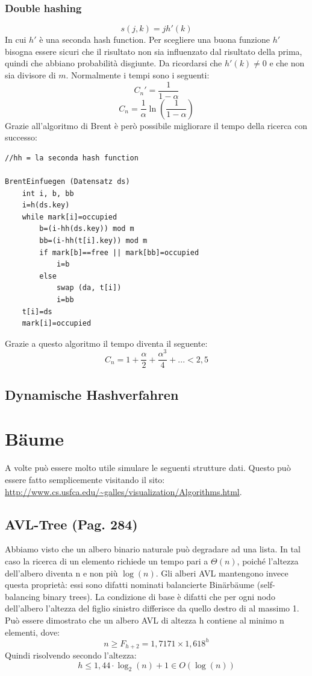 \documentclass[a4paper]{book}
\newcommand{\lstIndent}{4}
\begin{document}
\subsection{Double hashing}
$$s(j,k)=jh'(k) $$
In cui $h'$ è una seconda hash function. Per scegliere una buona funzione $h'$ bisogna essere sicuri che il risultato non sia influenzato dal risultato della prima, quindi che abbiano probabilità disgiunte. Da ricordarsi che $h'(k) \neq 0$ e che non sia divisore di $m$. Normalmente i tempi sono i seguenti:
$$ C_n '= \frac{1}{1-\alpha} $$
$$ C_n = \frac{1}{\alpha} \ln \left(\frac{1}{1-\alpha}\right)$$
Grazie all'algoritmo di Brent è però possibile migliorare il tempo della ricerca con successo:
\begin{lstlisting}[tabsize=\lstIndent]
//hh = la seconda hash function

BrentEinfuegen (Datensatz ds)
	int i, b, bb
	i=h(ds.key)
	while mark[i]=occupied
		b=(i-hh(ds.key)) mod m
		bb=(i-hh(t[i].key)) mod m
		if mark[b]==free || mark[bb]=occupied
			i=b
		else
			swap (da, t[i])
			i=bb
	t[i]=ds
	mark[i]=occupied			
\end{lstlisting}
Grazie a questo algoritmo il tempo diventa il seguente:
$$C_n = 1+\frac{\alpha}{2}+\frac{\alpha ^3}{4}+... <2,5$$
\section{Dynamische Hashverfahren}
\chapter{Bäume}
A volte può essere molto utile simulare le seguenti strutture dati. Questo può essere fatto semplicemente visitando il sito: \url{http://www.cs.usfca.edu/~galles/visualization/Algorithms.html}.
\section{AVL-Tree (Pag. 284)}
Abbiamo visto che un albero binario naturale può degradare ad una lista. In tal caso la ricerca di un elemento richiede un tempo pari a $\Theta (n)$, poiché l'altezza dell'albero diventa n e non più $\log(n)$. Gli alberi AVL mantengono invece questa proprietà: essi sono difatti nominati balancierte Binärbäume (self-balancing binary trees). La condizione di base è difatti che per ogni nodo dell'albero l'altezza del figlio sinistro differisce da quello destro di al massimo 1. Può essere dimostrato che un albero AVL di altezza h contiene al minimo n elementi, dove:
$$ n\geq F_{h+2} = 1,7171\times 1,618^h$$
Quindi risolvendo secondo l'altezza:
$$ h\leq 1,44 \cdot\log_2 (n)+1 \in O(\log(n))$$
\end{document}
